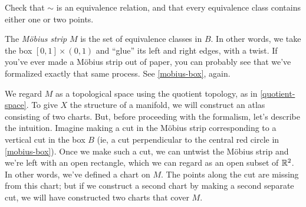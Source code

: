 \begin{figure}
\begin{center}
	\end{center}
\end{figure}

\begin{exercise}
	Check that $\sim$ is an equivalence relation, and that every equivalence class contains either one or two points. 
\end{exercise}

The \emph{M\"obius strip} $M$ is the set of equivalence classes in $B$. In other words, we take the box $[0,1] \times (0,1)$ and ``glue'' its left and right edges, with a twist. If you've ever made a M\"obius strip out of paper, you can probably see that we've formalized exactly that same process. See \cref{mobius-box}, again.

We regard $M$ as a topological space using the quotient topology, as in \cref{quotient-space}. To give $X$ the structure of a manifold, we will construct an atlas consisting of two charts. But, before proceeding with the formalism, let's describe the intuition. Imagine making a cut in the M\"obius strip corresponding to a vertical cut in the box $B$ (ie, a cut perpendicular to the central red circle in \cref{mobius-box}). Once we make such a cut, we can untwist the M\"obius strip and we're left with an open rectangle, which we can regard as an open subset of $\mathbb{R}^2$. In other words, we've defined a chart on $M$. The points along the cut are missing from this chart; but if we construct a second chart by making a second separate cut, we will have constructed two charts that cover $M$. 


